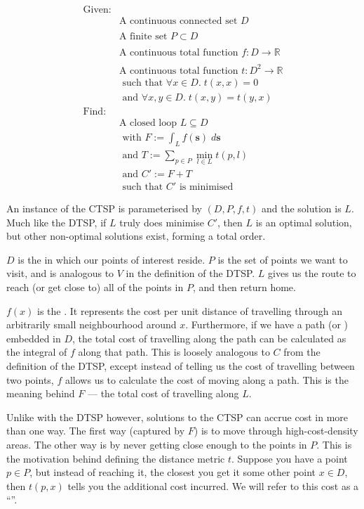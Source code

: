 \begin{align*}
  \textrm{Given:} & \\
  &\textrm{A continuous connected set }D \\ \\
  &\textrm{A finite set }P\subset D \\ \\
  &\textrm{A continuous total function }f : D\rightarrow\mathbb{R} \\ \\
  &\textrm{A continuous total function }t : D^2\rightarrow\mathbb{R} \\
  &\textrm{ such that }\forall x \in D.\; t(x,x)=0 \\
  &\textrm{ and }\forall x,y \in D.\; t(x,y)=t(y,x) \\
  \textrm{Find:} & \\
  &\textrm{A closed loop }L\subseteq D \\
  &\textrm{ with }F:=\int_{L}f(\mathbf{s})\;d\mathbf{s} \\
  &\textrm{ and }T:=\sum_{p \in P} \min_{l\in L}{t(p,l)} \\
  &\textrm{ and }C':=F+T \\
  &\textrm{ such that }C'\textrm{ is minimised }
\end{align*}

An instance of the CTSP is parameterised by $(D,P,f,t)$ and the solution is $L$. Much like the DTSP, if $L$ truly does minimise $C'$, then $L$ is an optimal solution, but other non-optimal solutions exist, forming a total order.

$D$ is the  in which our points of interest reside. $P$ is the set of points we want to visit, and is analogous to $V$ in the definition of the DTSP. $L$ gives us the route to reach (or get close to) all of the points in $P$, and then return home.

$f(x)$ is the . It represents the cost per unit distance of travelling through an arbitrarily small neighbourhood around $x$. Furthermore, if we have a path (or ) embedded in $D$, the total cost of travelling along the path can be calculated as the integral of $f$ along that path. This is loosely analogous to $C$ from the definition of the DTSP, except instead of telling us the cost of travelling between two points, $f$ allows us to calculate the cost of moving along a path. This is the meaning behind $F$ --- the total cost of travelling along $L$.

Unlike with the DTSP however, solutions to the CTSP can accrue cost in more than one way. The first way (captured by $F$) is to move through high-cost-density areas. The other way is by never getting close enough to the points in $P$. This is the motivation behind defining the distance metric $t$. Suppose you have a point $p\in P$, but instead of reaching it, the closest you get it some other point $x\in D$, then $t(p,x)$ tells you the additional cost incurred. We will refer to this cost as a ``''.

